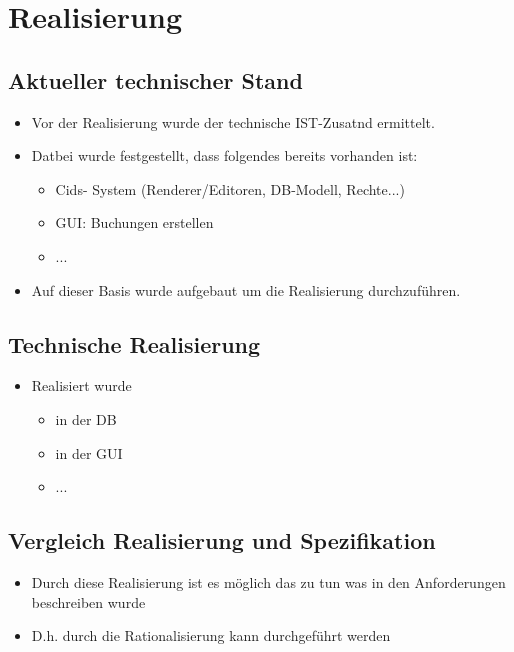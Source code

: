 \chapter{Realisierung}

\section{Aktueller technischer Stand}
\begin{itemize}
	\item Vor der Realisierung wurde der technische IST-Zusatnd ermittelt.
	\item Datbei wurde festgestellt, dass folgendes bereits vorhanden ist:
	\begin{itemize}
		\item Cids- System (Renderer/Editoren, DB-Modell, Rechte...)
		\item GUI: Buchungen erstellen
		\item ...
	\end{itemize}
	\item Auf dieser Basis wurde aufgebaut um die Realisierung durchzuführen.
\end{itemize}

\section{Technische Realisierung}
\begin{itemize}
	\item Realisiert wurde
	\begin{itemize}
		\item in der DB
		\item in der GUI
		\item ...
	\end{itemize}
\end{itemize}


\section{Vergleich Realisierung und Spezifikation}
\begin{itemize}
	\item Durch diese Realisierung ist es möglich das zu tun was in den Anforderungen beschreiben wurde
	\item D.h. durch die Rationalisierung kann durchgeführt werden
\end{itemize}